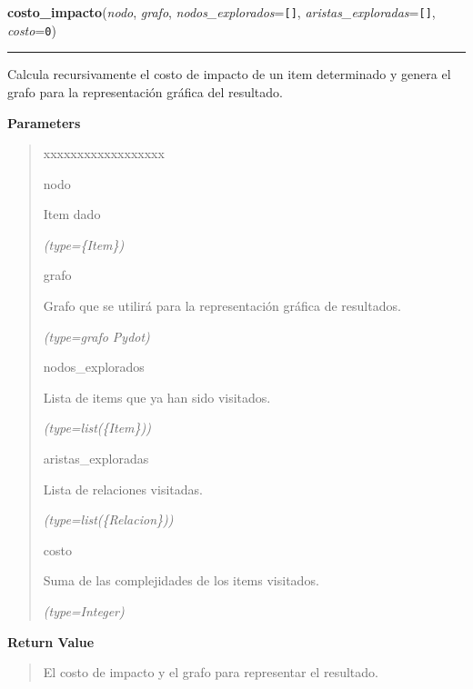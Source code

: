 \hspace{.8\funcindent}\begin{boxedminipage}{\funcwidth}

    \raggedright \textbf{costo\_impacto}(\textit{nodo}, \textit{grafo}, \textit{nodos\_explorados}={\tt []}, \textit{aristas\_exploradas}={\tt []}, \textit{costo}={\tt 0})

    \vspace{-1.5ex}

    \rule{\textwidth}{0.5\fboxrule}
\setlength{\parskip}{2ex}
    Calcula recursivamente el costo de impacto de un item determinado y 
    genera el grafo para la representación gráfica del resultado.

\setlength{\parskip}{1ex}
      \textbf{Parameters}
      \vspace{-1ex}

      \begin{quote}
        \begin{Ventry}{xxxxxxxxxxxxxxxxxx}

          \item[nodo]

          Item dado

            {\it (type=\{Item\})}

          \item[grafo]

          Grafo que se utilirá para la representación gráfica de 
          resultados.

            {\it (type=grafo Pydot)}

          \item[nodos\_explorados]

          Lista de items que ya han sido visitados.

            {\it (type=list(\{Item\}))}

          \item[aristas\_exploradas]

          Lista de relaciones visitadas.

            {\it (type=list(\{Relacion\}))}

          \item[costo]

          Suma de las complejidades de los items visitados.

            {\it (type=Integer)}

        \end{Ventry}

      \end{quote}

      \textbf{Return Value}
    \vspace{-1ex}

      \begin{quote}
      El costo de impacto y el grafo para representar el resultado.

      \end{quote}

    \end{boxedminipage}

